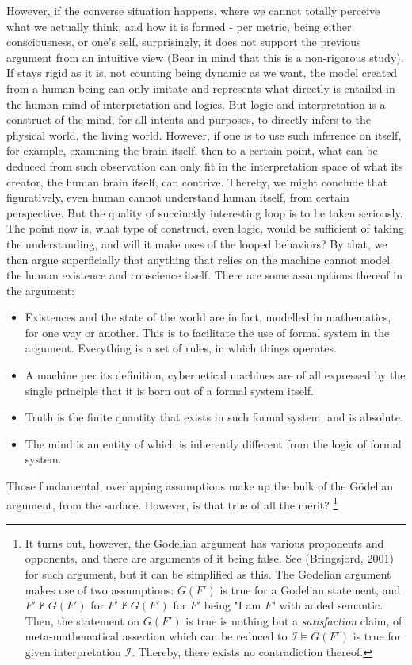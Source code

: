 However, if the converse situation happens, where we cannot totally perceive what we actually think, and how it is formed - per metric, being either consciousness, or one's self, surprisingly, it does not support the previous argument from an intuitive view (Bear in mind that this is a non-rigorous study). If stays rigid as it is, not counting being dynamic as we want, the model created from a human being can only imitate and represents what directly is entailed in the human mind of interpretation and logics. But logic and interpretation is a construct of the mind, for all intents and purposes, to directly infers to the physical world, the living world. However, if one is to use such inference on itself, for example, examining the brain itself, then to a certain point, what can be deduced from such observation can only fit in the interpretation space of what its creator, the human brain itself, can contrive. Thereby, we might conclude that figuratively, even human cannot understand human itself, from certain perspective. But the quality of succinctly interesting loop is to be taken seriously. The point now is, what type of construct, even logic, would be sufficient of taking the understanding, and will it make uses of the looped behaviors? By that, we then argue superficially that anything that relies on the machine cannot model the human existence and conscience itself. There are some assumptions thereof in the argument:
\begin{itemize}[noitemsep,topsep=1pt]
    \item Existences and the state of the world are in fact, modelled in mathematics, for one way or another. This is to facilitate the use of formal system in the argument. Everything is a set of rules, in which things operates.
    \item A machine per its definition, cybernetical machines are of all expressed by the single principle that it is born out of a formal system itself.
    \item Truth is the finite quantity that exists in such formal system, and is absolute. 
    \item The mind is an entity of which is inherently different from the logic of formal system.
\end{itemize}

Those fundamental, overlapping assumptions make up the bulk of the Gödelian argument, from the surface. However, is that true of all the merit? \footnote{It turns out, however, the Godelian argument has various proponents and opponents, and there are arguments of it being false. See (Bringsjord, 2001) for such argument, but it can be simplified as this. The Godelian argument makes use of two assumptions: $G(F')$ is true for a Godelian statement, and $F'\not\vdash G(F')$ for $F'\not \vdash G(F')$ for $F'$ being "I am $F$" with added semantic. Then, the statement on $G(F')$ is true is nothing but a \textit{satisfaction} claim, of meta-mathematical assertion which can be reduced to $\mathcal{I}\vDash G(F')$ is true for given interpretation $\mathcal{I}$. Thereby, there exists no contradiction thereof.}